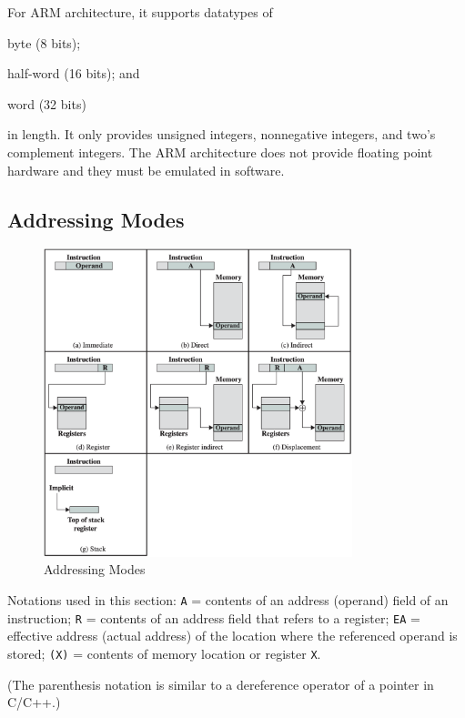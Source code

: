For ARM architecture, it supports datatypes of \begin{enumerate*}[label=\textbf{(\arabic*)}]
    \item byte (8 bits);
    \item half-word (16 bits); and
    \item word (32 bits)
\end{enumerate*} in length.
It only provides unsigned integers, nonnegative integers, and two's complement integers. 
The ARM architecture does not provide floating point hardware and they must be emulated in
software.

\subsection{Addressing Modes}

\begin{figure}[H]
    \centering
    \includegraphics[width=0.8\textwidth]{chaps/instructions-sets/addressing-modes.png}
    \caption{Addressing Modes}
\end{figure}

\begin{remark}
    Notations used in this section:
    \texttt{A} = contents of an address (operand) field of an instruction;
    \texttt{R} = contents of an address field that refers to a register;
    \texttt{EA} = effective address (actual address) of the location where the referenced operand is stored;
    \texttt{(X)} = contents of memory location or register \texttt{X}.

    (The parenthesis notation is similar to a dereference operator of a pointer in C/C++.)
\end{remark}